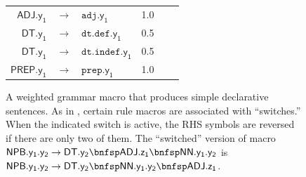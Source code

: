 \documentclass[11pt,a4paper]{article}
\renewcommand{\bnfpn}[1]{\mathsf{#1}}
\renewcommand{\bnfpo}{\rightarrow}
\renewcommand{\bnfts}[1]{\mathtt{#1}}
\begin{document}
\begin{figure}[p]
\begin{tabular}{rcl|l|l|l}
$\bnfpn{ADJ.y_1}$ &$\bnfpo$& $\bnfts{adj}.\bnfpn{y_1}$ & 1.0 & \\
$\bnfpn{DT.y_1}$ &$\bnfpo$& $\bnfts{dt.def}.\bnfpn{y_1}$ & 0.5 & \\
$\bnfpn{DT.y_1}$ &$\bnfpo$& $\bnfts{dt.indef}.\bnfpn{y_1}$ & 0.5 & \\
$\bnfpn{PREP.y_1}$ &$\bnfpo$& $\bnfts{prep}.\bnfpn{y_1}$ & 1.0 & \\
\end{tabular}
\caption{A weighted grammar macro that produces simple declarative sentences. As in \citet{white-cotterell-2021-examining}, certain rule macros are associated with ``switches.'' When the indicated switch is active, the RHS symbols are reversed if there are only two of them. The ``switched'' version of macro $\bnfpn{NPB.y_1.y_2} \bnfpo \bnfpn{DT.y_2} \bnfsp \bnfpn{ADJ.z_1} \bnfsp \bnfpn{NN.y_1.y_2}$ is $\bnfpn{NPB.y_1.y_2} \bnfpo \bnfpn{DT.y_2}  \bnfsp \bnfpn{NN.y_1.y_2} \bnfsp \bnfpn{ADJ.z_1}$. \label{fig:white1}}
\end{figure}
\end{document}
